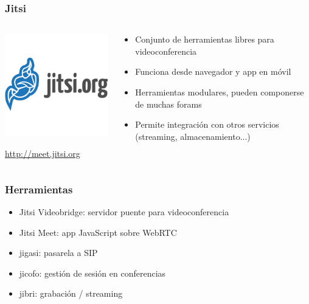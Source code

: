 \begin{frame}
\frametitle{Jitsi}

\begin{columns}[T]
\begin{column}{.48\textwidth}
\includegraphics[width=6.5cm]{figs/jitsi-logo}

\begin{flushright}
  {\Large
    \url{http://meet.jitsi.org}
  }
\end{flushright}

\end{column}%
\hfill%
\begin{column}{.50\textwidth}
{\Large
\begin{itemize}
\item Conjunto de herramientas libres para videoconferencia
\item Funciona desde navegador y app en móvil
\item Herramientas modulares, pueden componerse de muchas forams
\item Permite integración con otros servicios (streaming, almacenamiento...)
\end{itemize}
}
\end{column}%
\end{columns}

\end{frame}


\begin{frame}
\frametitle{Herramientas}

{\Large
  
  \begin{itemize}
  \item Jitsi Videobridge: servidor puente para videoconferencia
  \item Jitsi Meet: app JavaScript sobre WebRTC
  \item jigasi: pasarela a SIP
  \item jicofo: gestión de sesión en conferencias
  \item jibri: grabación / streaming
  \end{itemize}
  
}
\end{frame}


